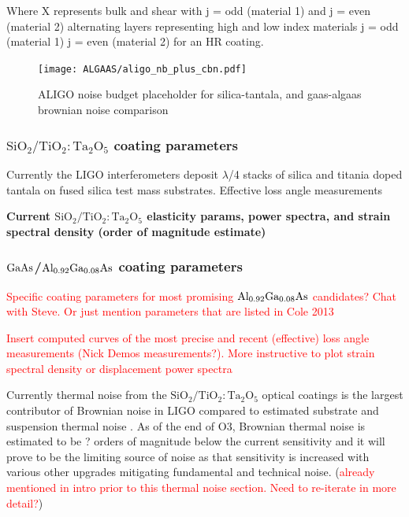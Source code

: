 Where X represents bulk and shear with j = odd (material 1) and j = even (material 2) alternating layers representing high and low index materials j = odd (material 1) j = even (material 2) for an HR coating.

\begin{figure}[H]
    \begin{center}
    \texttt{[image: ALGAAS/aligo\_nb\_plus\_cbn.pdf]}
    \end{center}
    \caption{ALIGO noise budget placeholder for silica-tantala, and gaas-algaas brownian noise comparison}
\label{fig:aligo_tn_comparison}
\end{figure}

\subsubsection{$\mathrm{SiO_2}/\mathrm{TiO_2:Ta_2O_5}$ coating parameters}
Currently the LIGO interferometers deposit $\lambda$/4 stacks of silica and titania doped tantala on fused silica test mass substrates. Effective loss angle measurements \cite{Harry:06}

\textbf{Current $\mathrm{SiO_2}/\mathrm{TiO_2:Ta_2O_5}$ elasticity params, power spectra, and strain spectral density (order of magnitude estimate)}

\subsubsection{$\mathrm{GaAs}$/$\mathrm{Al_{0.92}Ga_{0.08}As}$ coating parameters}
\textcolor{red}{Specific coating parameters for most promising $\mathrm{Al_{0.92}Ga_{0.08}As}$ candidates? Chat with Steve. Or just mention parameters that are listed in Cole 2013}
\cite{Cole:2013}

\textcolor{red}{Insert computed curves of the most precise and recent (effective) loss angle measurements (Nick Demos measurements?). More instructive to plot strain spectral density or displacement power spectra}

\noindent Currently thermal noise from the $\mathrm{SiO_2}/\mathrm{TiO_2:Ta_2O_5}$ optical coatings is the largest contributor of Brownian noise in LIGO compared to estimated substrate and suspension thermal noise \cite{Harry:06}. As of the end of O3, Brownian thermal noise is estimated to be ? orders of magnitude below the current sensitivity and it will prove to be the limiting source of noise as that sensitivity is increased with various other upgrades mitigating fundamental and technical noise. (\textcolor{red}{already mentioned in intro prior to this thermal noise section. Need to re-iterate in more detail?})
